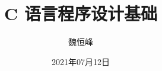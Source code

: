 \documentclass[]{beamer}
\title[C 语言程序设计基础]{C 语言程序设计基础}
\author[魏恒峰]{\large 魏恒峰}
\institute{hfwei@nju.edu.cn}
\date{2021年07月12日}
\begin{document}
\maketitle





\thankyou{}

\end{document}
